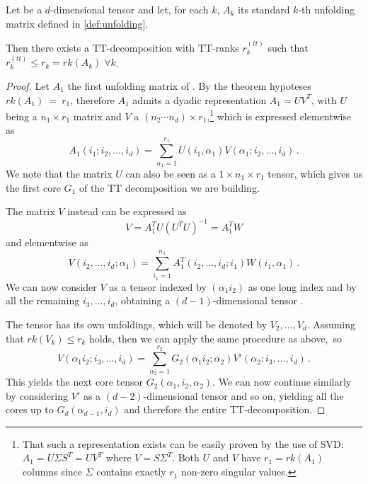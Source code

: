 \begin{Teo} \label{teo:ttsvd}
  Let \A be a $d$-dimensional tensor and let, for each $k$, $A_k$ its standard $k$-th unfolding matrix defined in \ref{def:unfolding}.

  Then there exists a TT-decomposition with TT-ranks $r^{(tt)}_k$ such that $r^{(tt)}_k \leq r_k = rk(A_k) \; \forall k$.

  \begin{proof}
    Let $A_1$ the first unfolding matrix of \A. By the theorem hypoteses $rk(A_1)~=~r_1$, therefore 
    $A_1$ admits a dyadic representation $A_1 = UV^T$, with $U$ being a $n_1 \times r_1$ matrix and $V$ a $(n_2 \cdots n_d) \times r_1$,\footnote{That such a representation exists can be easily proven by the use of SVD: $A_1 = U \Sigma S^T = UV^T$ where $V = S \Sigma^T$. Both $U$ and $V$ have $r_1 = rk(A_1)$ columns since $\Sigma$ contains exactly $r_1$ non-zero singular values.}
    which is expressed elementwise as
    \begin{equation*}
      A_1(i_1;i_2,\ldots,i_d) = \sum_{\alpha_1 = 1}^{r_1} U(i_1,\alpha_1) V(\alpha_1;i_2,\ldots,i_d)\, .
    \end{equation*}
    We note that the matrix $U$ can also be seen as a $1 \times n_1 \times r_1$ tensor, which gives us the first core $G_1$ of the TT decomposition we are building.

    The matrix $V$ instead can be expressed as
    \begin{equation}\label{eq:Vdecomp}
      V = A_1^T U (U^T U)^{-1} = A_1^T W
    \end{equation}
    and elementwise as
    \begin{equation*}
      V(i_2,\ldots,i_d;\alpha_1) = \sum_{i_1 = 1}^{n_1} A_1^T(i_2,\ldots,i_d;i_1) W(i_1,\alpha_1)\, .
    \end{equation*}
    We can now consider $V$ as a tensor indexed by $(\alpha_1 i_2)$ as one long index and by all the remaining $i_3, \ldots, i_d$, obtaining a $(d-1)$-dimensional tensor \V.

    The tensor \V has its own unfoldings, which will be denoted by $V_2,\ldots,V_d$. Assuming that $rk(V_k) \leq r_k$ holds, then we can apply the same procedure as above,~so
    \begin{equation*}
      V(\alpha_1 i_2;i_3,\ldots,i_d) = \sum_{\alpha_2=1}^{r_2} G_2(\alpha_1 i_2;\alpha_2) V'(\alpha_2;i_3,\ldots,i_d)\, .
    \end{equation*}
    This yields the next core tensor $G_2(\alpha_1,i_2,\alpha_2)$.
    We can now continue similarly by considering $V'$ as a $(d-2)$-dimensional tensor and so on, yielding all the cores up to $G_d(\alpha_{d-1},i_d)$ and therefore the entire TT-decomposition.


\end{proof}
\end{Teo}
